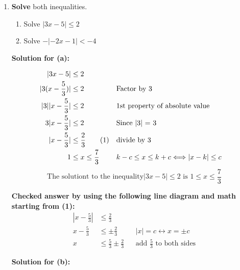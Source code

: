 \documentclass[12pt]{book}
\newcommand\numberthis{\addtocounter{equation}{1}\tag{\theequation}}
\begin{document}
\begin{enumerate}

\newpage

\item \textbf{Solve} both inequalities.

\begin{enumerate}
\item Solve $|3x-5| \le 2$
\item Solve $-|-2x-1| < -4$
\end{enumerate}

\vspace{0.3cm} 
\textbf{Solution for (a):}

\addtolength{\jot}{1em}
\begin{align*}
    |3x-5| & \le 2 \\
    |3(x - \frac{5}{3})| & \le 2 && \text{Factor by 3}\\
    |3||x - \frac{5}{3}| & \le 2 && \text{1st property of absolute value}\\
    3|x - \frac{5}{3}| & \le 2 && \text{Since |3| = 3}\\
    |x - \frac{5}{3}| & \le \frac{2}{3} \numberthis &&  \text{divide by 3}\\
    1 & \le x \le \frac{7}{3} && k - c \leq x \leq k + c \Longleftrightarrow |x-k| \leq c
\end{align*}
$$ \text{The solutiont to the inequality} |3x-5| \le 2 \text{ is } \boxed{1 \le x \le \frac{7}{3}} $$

\vspace{0.3em}
\textbf{Checked answer by using the following line diagram and math starting from (1):}
\addtolength{\jot}{0em}
\begin{align*}
    |x - \frac{5}{3}| & \le \frac{2}{3}\\
    x - \frac{5}{3} & \le \pm \frac{2}{3} && |x| = c \longleftrightarrow x = \pm c\\
    x & \le \frac{5}{3} \pm \frac{2}{3} && \text{add $\frac{5}{3}$ to both sides}
\end{align*}

\clearpage
\vspace{0.3cm} 
\textbf{Solution for (b):}


\end{enumerate}
\end{document}
